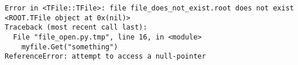 \begin{footnotesize}
\begin{verbatim}
Error in <TFile::TFile>: file file_does_not_exist.root does not exist
<ROOT.TFile object at 0x(nil)>
Traceback (most recent call last):
  File "file_open.py.tmp", line 16, in <module>
    myfile.Get("something")
ReferenceError: attempt to access a null-pointer
\end{verbatim}
\end{footnotesize}
